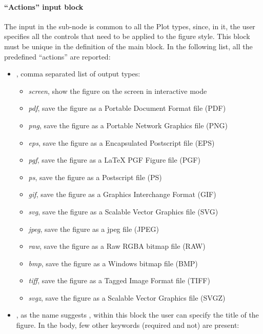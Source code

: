 \paragraph{``Actions'' input block \label{sec:actionsBlock}}
The input in the  sub-node is common to all the Plot types, since, in
it, the user specifies all the controls that need to be applied to the figure
style.
%
This block must be unique in the definition of the  main block.
%
In the following list, all the predefined ``actions'' are reported:
\vspace{-5mm}
\begin{itemize}
  \itemsep0em
  \item {}, comma separated list of output types:
     \begin{itemize}
    \item \textit{screen}, show the figure on the screen in interactive mode
    \item \textit{pdf}, save the figure as a Portable Document Format file (PDF)
    \item \textit{png}, save the figure as a Portable Network Graphics file
    (PNG)
    \item \textit{eps}, save the figure as a Encapsulated Postscript file (EPS)
    \item \textit{pgf}, save the figure as a LaTeX PGF Figure file (PGF)
    \item \textit{ps}, save the figure as a Postscript file (PS)
    \item \textit{gif}, save the figure as a Graphics Interchange Format (GIF)
    \item \textit{svg}, save the figure as a Scalable Vector Graphics file (SVG)
    \item \textit{jpeg}, save the figure as a jpeg file (JPEG)
    \item \textit{raw}, save the figure as a Raw RGBA bitmap file (RAW)
    \item \textit{bmp}, save the figure as a Windows bitmap file (BMP)
    \item \textit{tiff}, save the figure as a Tagged Image Format file (TIFF)
    \item \textit{svgz}, save the figure as a Scalable Vector Graphics file
    (SVGZ)
      \end{itemize}
  \item {}, as the name suggests , within this block the user can specify
  the title of the figure.
  In the body, few other keywords (required and not) are present:


\end{itemize}
